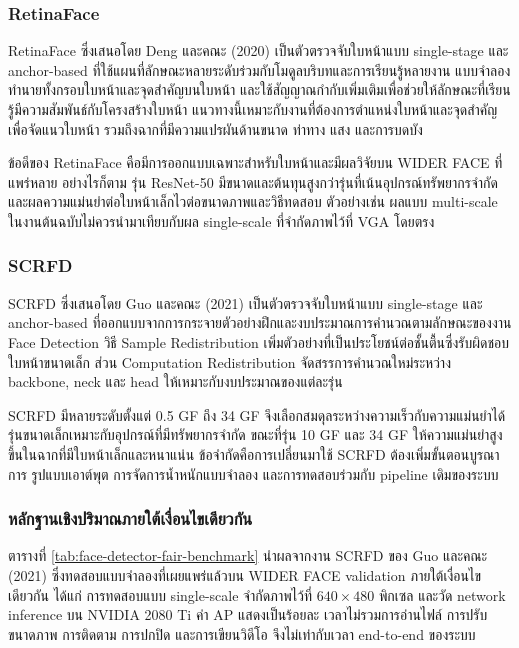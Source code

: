 \subsubsection{RetinaFace}

RetinaFace ซึ่งเสนอโดย Deng และคณะ (2020) เป็นตัวตรวจจับใบหน้าแบบ single-stage และ anchor-based ที่ใช้แผนที่ลักษณะหลายระดับร่วมกับโมดูลบริบทและการเรียนรู้หลายงาน แบบจำลองทำนายทั้งกรอบใบหน้าและจุดสำคัญบนใบหน้า และใช้สัญญาณกำกับเพิ่มเติมเพื่อช่วยให้ลักษณะที่เรียนรู้มีความสัมพันธ์กับโครงสร้างใบหน้า แนวทางนี้เหมาะกับงานที่ต้องการตำแหน่งใบหน้าและจุดสำคัญเพื่อจัดแนวใบหน้า รวมถึงฉากที่มีความแปรผันด้านขนาด ท่าทาง แสง และการบดบัง \cite{deng2020retinaface}

ข้อดีของ RetinaFace คือมีการออกแบบเฉพาะสำหรับใบหน้าและมีผลวิจัยบน WIDER FACE ที่แพร่หลาย อย่างไรก็ตาม รุ่น ResNet-50 มีขนาดและต้นทุนสูงกว่ารุ่นที่เน้นอุปกรณ์ทรัพยากรจำกัด และผลความแม่นยำต่อใบหน้าเล็กไวต่อขนาดภาพและวิธีทดสอบ ตัวอย่างเช่น ผลแบบ multi-scale ในงานต้นฉบับไม่ควรนำมาเทียบกับผล single-scale ที่จำกัดภาพไว้ที่ VGA โดยตรง

\subsubsection{SCRFD}

SCRFD ซึ่งเสนอโดย Guo และคณะ (2021) เป็นตัวตรวจจับใบหน้าแบบ single-stage และ anchor-based ที่ออกแบบจากการกระจายตัวอย่างฝึกและงบประมาณการคำนวณตามลักษณะของงาน Face Detection วิธี Sample Redistribution เพิ่มตัวอย่างที่เป็นประโยชน์ต่อชั้นตื้นซึ่งรับผิดชอบใบหน้าขนาดเล็ก ส่วน Computation Redistribution จัดสรรการคำนวณใหม่ระหว่าง backbone, neck และ head ให้เหมาะกับงบประมาณของแต่ละรุ่น \cite{guo2021scrfd}

SCRFD มีหลายระดับตั้งแต่ 0.5 GF ถึง 34 GF จึงเลือกสมดุลระหว่างความเร็วกับความแม่นยำได้ รุ่นขนาดเล็กเหมาะกับอุปกรณ์ที่มีทรัพยากรจำกัด ขณะที่รุ่น 10 GF และ 34 GF ให้ความแม่นยำสูงขึ้นในฉากที่มีใบหน้าเล็กและหนาแน่น ข้อจำกัดคือการเปลี่ยนมาใช้ SCRFD ต้องเพิ่มขั้นตอนบูรณาการ รูปแบบเอาต์พุต การจัดการน้ำหนักแบบจำลอง และการทดสอบร่วมกับ pipeline เดิมของระบบ

\subsubsection{หลักฐานเชิงปริมาณภายใต้เงื่อนไขเดียวกัน}

ตารางที่ \ref{tab:face-detector-fair-benchmark} นำผลจากงาน SCRFD ของ Guo และคณะ (2021) ซึ่งทดสอบแบบจำลองที่เผยแพร่แล้วบน WIDER FACE validation ภายใต้เงื่อนไขเดียวกัน ได้แก่ การทดสอบแบบ single-scale จำกัดภาพไว้ที่ $640\times480$ พิกเซล และวัด network inference บน NVIDIA 2080 Ti ค่า AP แสดงเป็นร้อยละ เวลาไม่รวมการอ่านไฟล์ การปรับขนาดภาพ การติดตาม การปกปิด และการเขียนวิดีโอ จึงไม่เท่ากับเวลา end-to-end ของระบบ \cite{guo2021scrfd}

